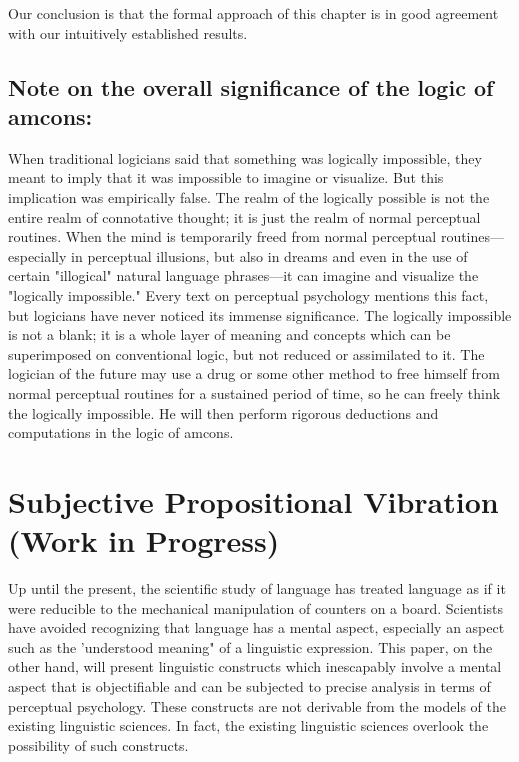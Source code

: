 \documentclass[10pt,twoside,draft]{memoir}
\begin{document}
{{{{\begin{enumerate}
Our conclusion is that the formal approach of this chapter is in good 
agreement with our intuitively established results. 

\section*{Note on the overall significance of the logic of amcons:}

When traditional logicians said that something was logically impossible, 
they meant to imply that it was impossible to imagine or visualize. But this 
implication was empirically false. The realm of the logically possible is not 
the entire realm of connotative thought; it is just the realm of normal 
perceptual routines. When the mind is temporarily freed from normal 
perceptual routines---especially in perceptual illusions, but also in dreams and 
even in the use of certain "illogical" natural language phrases---it can imagine 
and visualize the "logically impossible." Every text on perceptual 
psychology mentions this fact, but logicians have never noticed its immense 
significance. The logically impossible is not a blank; it is a whole layer of 
meaning and concepts which can be superimposed on conventional logic, but 
not reduced or assimilated to it. The logician of the future may use a drug or 
some other method to free himself from normal perceptual routines for a 
sustained period of time, so he can freely think the logically impossible. He 
will then perform rigorous deductions and computations in the logic of 
amcons. 

\chapter{Subjective Propositional Vibration (Work in Progress)}

Up until the present, the scientific study of language has treated 
language as if it were reducible to the mechanical manipulation of counters 
on a board. Scientists have avoided recognizing that language has a mental 
aspect, especially an aspect such as the 'understood meaning" of a linguistic 
expression. This paper, on the other hand, will present linguistic constructs 
which inescapably involve a mental aspect that is objectifiable and can be 
subjected to precise analysis in terms of perceptual psychology. These 
constructs are not derivable from the models of the existing linguistic 
sciences. In fact, the existing linguistic sciences overlook the possibility of 
such constructs. 


\end{enumerate}}}}}
\end{document}
